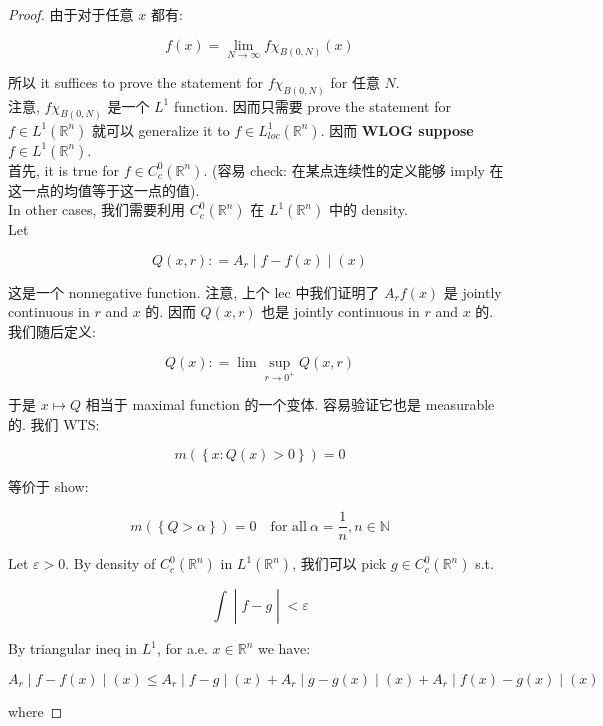 \begin{proof}

由于对于任意 \(x\) 都有:

\[f(x) = \lim\limits_{N\rightarrow\infty}f\chi_{B(0,N)}(x)\]

所以 it suffices to prove the statement for \(f\chi_{B(0,N)}\) for 任意 \(N\).\\
注意, \(f\chi_{B(0,N)}\) 是一个 \(L^{1}\) function. 因而只需要 prove the statement for \(f \in L^{1}(\mathbb{R}^{n})\) 就可以 generalize it to \(f \in L_{loc}^{1}(\mathbb{R}^{n})\). 因而 \textbf{WLOG suppose \(f \in L^{1}(\mathbb{R}^{n})\)}.\\
首先, it is true for \(f \in C_{c}^{0}(\mathbb{R}^{n})\). (容易 check: 在某点连续性的定义能够 imply 在这一点的均值等于这一点的值).\\
In other cases, 我们需要利用 \(C_{c}^{0}(\mathbb{R}^{n})\) 在 \(L^{1}(\mathbb{R}^{n})\) 中的 density.\\
Let

\[\left. Q(x,r): = A_{r} \middle| f - f(x) \middle| (x) \right.\]

这是一个 nonnegative function. 注意, 上个 lec 中我们证明了 \(A_{r}f(x)\) 是 jointly continuous in \(r\) and \(x\) 的. 因而 \(Q(x,r)\) 也是 jointly continuous in \(r\) and \(x\) 的.\\
我们随后定义:

\[Q(x): = \lim\sup\limits_{r\rightarrow 0^{+}}Q(x,r)\]

于是 \(x\mapsto Q\) 相当于 maximal function 的一个变体. 容易验证它也是 measurable 的. 我们 WTS:

\[m(\left\{ {x:Q(x) > 0} \right\}) = 0\]

等价于 show:

\[m(\left\{ {Q > \alpha} \right\}) = 0\quad\text{for all}\ \alpha = \frac{1}{n}, n \in \mathbb{N}\]

Let \(\varepsilon > 0\). By density of \(C_{c}^{0}(\mathbb{R}^{n})\) in \(L^{1}(\mathbb{R}^{n})\), 我们可以 pick \(g \in C_{c}^{0}(\mathbb{R}^{n})\) s.t.

\[\left. \int \middle| f - g \middle| < \varepsilon \right.\]

By triangular ineq in \(L^{1}\), for a.e. \(x \in \mathbb{R}^{n}\) we have:

\[\left. A_{r} \middle| f - f(x) \middle| (x) \leq A_{r} \middle| f - g \middle| (x) + A_{r} \middle| g - g(x) \middle| (x) + A_{r} \middle| f(x) - g(x) \middle| (x) \right.\]

where


\end{proof}
